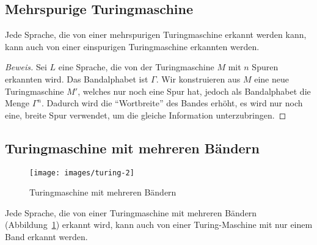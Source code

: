 \subsection{Mehrspurige Turingmaschine}
%
\begin{satz}\label{mehrspurigeturingmaschine}
Jede Sprache, die von einer mehrspurigen Turingmaschine
erkannt werden kann, kann auch von einer einspurigen Turingmaschine
erkannten werden.
\end{satz}

\begin{proof}[Beweis]
Sei $L$ eine Sprache, die von der Turingmaschine $M$ mit $n$ Spuren
erkannten wird. Das Bandalphabet ist $\Gamma$. Wir konstruieren aus
$M$ eine neue Turingmaschine $M'$, welches nur noch eine Spur hat,
jedoch als Bandalphabet die Menge $\Gamma^n$. Dadurch wird die ``Wortbreite''
des Bandes erhöht, es wird nur noch eine, breite Spur verwendet, um die
gleiche Information unterzubringen.
\end{proof}

\subsection{Turingmaschine mit mehreren Bändern}
%
\begin{figure}
\begin{center}
\texttt{[image: images/turing-2]}
\end{center}
\caption{Turingmaschine mit mehreren Bändern\label{multitapetm}}
\end{figure}
\begin{satz}
\label{mehrbandturingmaschine}
Jede Sprache, die von einer Turingmaschine mit mehreren Bändern
(Abbildung~\ref{multitapetm})
erkannt
wird, kann auch von einer Turing-Maschine mit nur einem Band erkannt
werden.
\end{satz}

